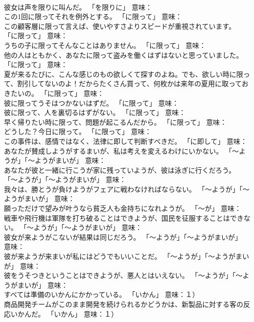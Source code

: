 \documentclass[8pt]{extreport}
\begin{document}
\begin{CJK}{UTF8}{min}
\\	彼女は声を限りに叫んだ。	「を限りに」 意味：
\\	この1回に限ってそれを例外とする。	「に限って」 意味：
\\	この顧客層に限って言えば、使いやすさよりスピードが重視されています。	「に限って」 意味：
\\	うちの子に限ってそんなことはありません。	「に限って」 意味：
\\	他の人はともかく、あなたに限って盗みを働くはずはないと思っていました。	「に限って」 意味：
\\	夏が来るたびに、こんな感じのもの欲しくて探すのよね。でも、欲しい時に限って、割引してないのよ！だからたくさん買って、何枚かは来年の夏用に取っておきたいの。	「に限って」 意味：
\\	彼に限ってうそはつかないはずだ。	「に限って」 意味：
\\	彼に限って、人を裏切るはずがない。	「に限って」 意味：
\\	早く帰りたい時に限って、問題が起こるんだから。	「に限って」 意味：
\\	どうした？今日に限って。	「に限って」 意味：
\\	この事件は、感情ではなく、法律に即して判断すべきだ。	「に即して」 意味：
\\	あなたが賛成しようがするまいが、私は考えを変えるわけにいかない。	「～ようが」「～ようがまいが」 意味：
\\	あなたが彼と一緒に行こうが家に残っていようが、彼は泳ぎに行くだろう。	「～ようが」「～ようがまいが」 意味：
\\	我々は、勝とうが負けようがフェアに戦わなければならない。	「～ようが」「～ようがまいが」 意味：
\\	願っただけで望みが叶うなら貧乏人も金持ちになれようが。	「～が」 意味：
\\	戦車や飛行機は軍隊を打ち破ることはできようが、国民を征服することはできない。	「～ようが」「～ようがまいが」 意味：
\\	彼女が来ようがこないが結果は同じだろう。	「～ようが」「～ようがまいが」 意味：
\\	彼が来ようが来まいが私にはどうでもいいことだ。	「～ようが」「～ようがまいが」 意味：
\\	彼をうそつきということはできようが、悪人とはいえない。	「～ようが」「～ようがまいが」 意味：
\\	すべては準備のいかんにかかっている。	「いかん」 意味：１）
\\	商品開発チームがこのまま開発を続けられるかどうかは、新製品に対する客の反応いかんだ。	「いかん」 意味：１）

\end{CJK}
\end{document}
